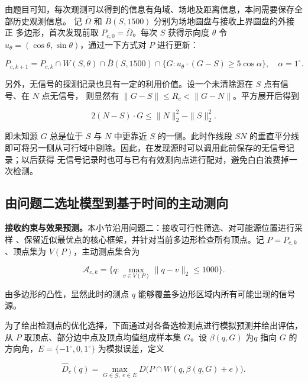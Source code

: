 \documentclass[withoutpreface,bwprint]{cumcmthesis} %
\begin{document}
由题目可知，每次观测可以得到的信息有角域、场地及距离信息，本问需要保存全部历史观测信息。
记 $\overline\Omega$ 和 $\overline B(S,1500)$ 分别为场地圆盘与接收上界圆盘的外接正
多边形，首次发现前取 $P_{c,0}=\overline\Omega$。每次 $S$ 获得示向度 $\theta$ 令 
$u_\theta=(\cos\theta,\sin\theta)$，通过一下方式对 $P$ 进行更新：

\begin{equation}\label{eq:p3-update}
P_{c,k+1}=P_{c,k}\cap W(S,\theta)\cap\overline B(S,1500)
\cap\{G:u_\theta\cdot(G-S)\ge5\cos\alpha\},\quad \alpha=1^\circ.
\end{equation}

另外，无信号的探测记录也具有一定的利用价值。设一个未清除源在 $S$ 点有信号、在 $N$ 点无信号，
则显然有 $\|G-S\|\le R_c<\|G-N\|$。平方展开后得到

\begin{equation}\label{eq:p3-nosignal}
2(N-S)\cdot G\le\|N\|_2^2-\|S\|_2^2.
\end{equation}

即未知源 $G$ 总是位于 $S$ 与 $N$ 中更靠近 $S$ 的一侧。此时作线段 $SN$ 的垂直平分线
即可将另一侧从可行域中剔除。因此，在发现源时可以调用此前保存的无信号记录；以后获得
无信号记录时也可与已有有效测向点进行配对，避免白白浪费掉一次检测。

\subsection{由问题二选址模型到基于时间的主动测向}

\textbf{接收约束与效果预测。}本小节沿用问题二：接收可行性筛选、对可能源位置进行采样
、保留近似最优点的核心框架，并针对当前多边形检查所有顶点。记 $P=P_{c,k}$、顶点集为
$V(P)$，主动测点集合为

\begin{equation}\label{eq:p3-receive}
\mathcal A_{c,k}=\{q:\max_{v\in V(P)}\|q-v\|_2\le1000\}.
\end{equation}

由多边形的凸性，显然此时的测点 $q$ 能够覆盖多边形区域内所有可能出现的信号源。

为了给出检测点的优化选择，下面通过对各备选检测点进行模拟预测并给出评估，从 $P$ 取顶点、部分边中点及顶点均值组成样本集 $G$。设
$\beta(q,G)$ 为$q$ 指向 $G$ 的方向角，$E=\{-1^\circ,0,1^\circ\}$ 为模拟误差，定义

\begin{equation}\label{eq:p3-predict}
\widehat D_c(q)=\max_{G\in\mathcal G,\ e\in E}
D\bigl(P\cap W(q,\beta(q,G)+e)\bigr).
\end{equation}
\end{document}
